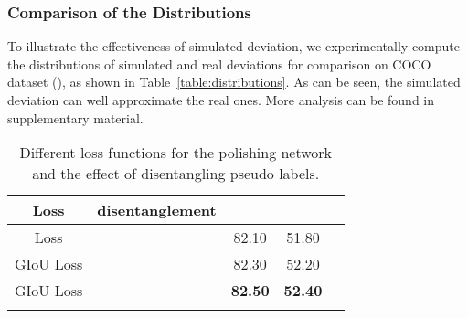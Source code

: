 \documentclass[letterpaper]{article} \usepackage{aaai23}  \usepackage{times}  \usepackage{helvet}  \usepackage{courier}  \usepackage[hyphens]{url}  \usepackage{graphicx} \urlstyle{rm} \def\UrlFont{\rm}  \usepackage{natbib}  \usepackage{caption} \frenchspacing  \setlength{\pdfpagewidth}{8.5in}  \setlength{\pdfpageheight}{11in}  \usepackage{algorithm}
\begin{document}
\begin{table}[htbp]  
\caption{Comparison of the simulated distributions.}\label{table:distributions}
\centering
{}
\end{table}

\subsubsection{\textbf{Comparison of the Distributions}}
To illustrate the effectiveness of simulated deviation, we experimentally compute the distributions of simulated and real deviations for comparison on COCO dataset (), as shown in Table~\ref{table:distributions}. 
As can be seen, the simulated deviation can well approximate the real ones. 
More analysis can be found in supplementary material. 


\begin{table}[htbp]  
\centering
\caption{Different loss functions for the polishing network and the effect of disentangling pseudo labels.}
\begin{tabular}{ccccc} 
    \hline
    Loss & disentanglement & &\\
    \hline
     Loss &  & 82.10 & 51.80 \\ 
    GIoU Loss &  & 82.30 & 52.20 \\
    GIoU Loss &  & \textbf{82.50} & \textbf{52.40} \\
    \hline
\label{table:reg_loss_n_disent}
\end{tabular}
\end{table}
\end{document}
